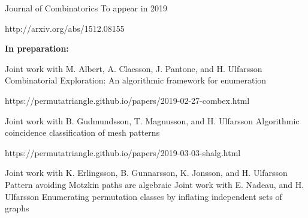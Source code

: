 \begin{cventries}
    {Journal of Combinatorics} %
    {To appear in 2019} %
    {
      \begin{cvitems} %
        \item {http://arxiv.org/abs/1512.08155}
      \end{cvitems}
    }
\begin{flushleft}
  \textbf{In preparation:}
\end{flushleft}
\cventry
{Joint work with M. Albert, A. Claesson, J. Pantone, and H. Ulfarsson} %
{Combinatorial Exploration: An algorithmic framework for enumeration} %
{} %
{} %
{
  \begin{cvitems} %
    \item {https://permutatriangle.github.io/papers/2019-02-27-combex.html}
  \end{cvitems}
}
\cventry
{Joint work with B. Gudmundsson, T. Magnusson, and H. Ulfarsson} %
{Algorithmic coincidence classification of mesh patterns} %
{} %
{} %
{
  \begin{cvitems} %
    \item {https://permutatriangle.github.io/papers/2019-03-03-shalg.html}
  \end{cvitems}
}
\cventry
{Joint work with K. Erlingsson, B. Gunnarsson, K. Jonsson, and H. Ulfarsson} %
{Pattern avoiding Motzkin paths are algebraic} %
{} %
{} %
{
}
\cventry
{Joint work with E. Nadeau, and H. Ulfarsson} %
{Enumerating permutation classes by inflating independent sets of graphs} %
{} %
{} %
{
}
\end{cventries}

